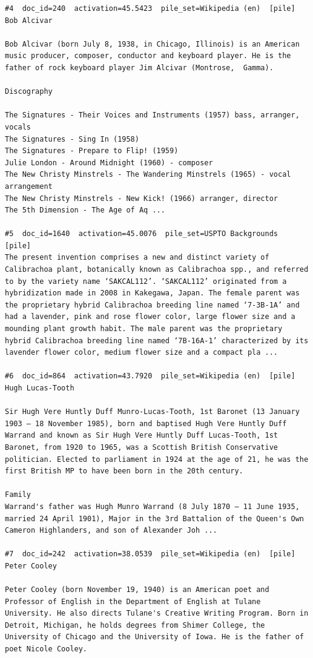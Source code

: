 \begin{verbatim}
#4  doc_id=240  activation=45.5423  pile_set=Wikipedia (en)  [pile]
Bob Alcivar

Bob Alcivar (born July 8, 1938, in Chicago, Illinois) is an American music producer, composer, conductor and keyboard player. He is the father of rock keyboard player Jim Alcivar (Montrose,  Gamma).

Discography

The Signatures - Their Voices and Instruments (1957) bass, arranger, vocals
The Signatures - Sing In (1958)
The Signatures - Prepare to Flip! (1959)
Julie London - Around Midnight (1960) - composer
The New Christy Minstrels - The Wandering Minstrels (1965) - vocal arrangement
The New Christy Minstrels - New Kick! (1966) arranger, director
The 5th Dimension - The Age of Aq ...

#5  doc_id=1640  activation=45.0076  pile_set=USPTO Backgrounds  [pile]
The present invention comprises a new and distinct variety of Calibrachoa plant, botanically known as Calibrachoa spp., and referred to by the variety name ‘SAKCAL112’. ‘SAKCAL112’ originated from a hybridization made in 2008 in Kakegawa, Japan. The female parent was the proprietary hybrid Calibrachoa breeding line named ‘7-3B-1A’ and had a lavender, pink and rose flower color, large flower size and a mounding plant growth habit. The male parent was the proprietary hybrid Calibrachoa breeding line named ‘7B-16A-1’ characterized by its lavender flower color, medium flower size and a compact pla ...

#6  doc_id=864  activation=43.7920  pile_set=Wikipedia (en)  [pile]
Hugh Lucas-Tooth

Sir Hugh Vere Huntly Duff Munro-Lucas-Tooth, 1st Baronet (13 January 1903 – 18 November 1985), born and baptised Hugh Vere Huntly Duff Warrand and known as Sir Hugh Vere Huntly Duff Lucas-Tooth, 1st Baronet, from 1920 to 1965, was a Scottish British Conservative politician. Elected to parliament in 1924 at the age of 21, he was the first British MP to have been born in the 20th century.

Family
Warrand's father was Hugh Munro Warrand (8 July 1870 – 11 June 1935, married 24 April 1901), Major in the 3rd Battalion of the Queen's Own Cameron Highlanders, and son of Alexander Joh ...

#7  doc_id=242  activation=38.0539  pile_set=Wikipedia (en)  [pile]
Peter Cooley

Peter Cooley (born November 19, 1940) is an American poet and Professor of English in the Department of English at Tulane University. He also directs Tulane's Creative Writing Program. Born in Detroit, Michigan, he holds degrees from Shimer College, the University of Chicago and the University of Iowa. He is the father of poet Nicole Cooley.


\end{verbatim}
